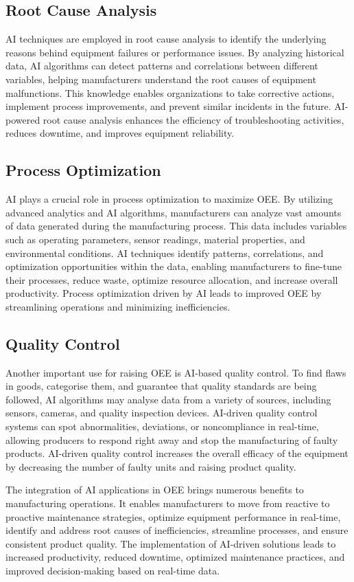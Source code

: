 \documentclass[12pt]{article}
\begin{document}
\subsection{Root Cause Analysis}
AI techniques are employed in root cause analysis to identify the underlying reasons behind equipment failures or performance issues. By analyzing historical data, AI algorithms can detect patterns and correlations between different variables, helping manufacturers understand the root causes of equipment malfunctions. This knowledge enables organizations to take corrective actions, implement process improvements, and prevent similar incidents in the future. AI-powered root cause analysis enhances the efficiency of troubleshooting activities, reduces downtime, and improves equipment reliability.

\subsection{Process Optimization}
AI plays a crucial role in process optimization to maximize OEE. By utilizing advanced analytics and AI algorithms, manufacturers can analyze vast amounts of data generated during the manufacturing process. This data includes variables such as operating parameters, sensor readings, material properties, and environmental conditions. AI techniques identify patterns, correlations, and optimization opportunities within the data, enabling manufacturers to fine-tune their processes, reduce waste, optimize resource allocation, and increase overall productivity. Process optimization driven by AI leads to improved OEE by streamlining operations and minimizing inefficiencies.

\subsection{Quality Control}
Another important use for raising OEE is AI-based quality control. To find flaws in goods, categorise them, and guarantee that quality standards are being followed, AI algorithms may analyse data from a variety of sources, including sensors, cameras, and quality inspection devices. AI-driven quality control systems can spot abnormalities, deviations, or noncompliance in real-time, allowing producers to respond right away and stop the manufacturing of faulty products. AI-driven quality control increases the overall efficacy of the equipment by decreasing the number of faulty units and raising product quality.


The integration of AI applications in OEE brings numerous benefits to manufacturing operations. It enables manufacturers to move from reactive to proactive maintenance strategies, optimize equipment performance in real-time, identify and address root causes of inefficiencies, streamline processes, and ensure consistent product quality. The implementation of AI-driven solutions leads to increased productivity, reduced downtime, optimized maintenance practices, and improved decision-making based on real-time data.
\end{document}
